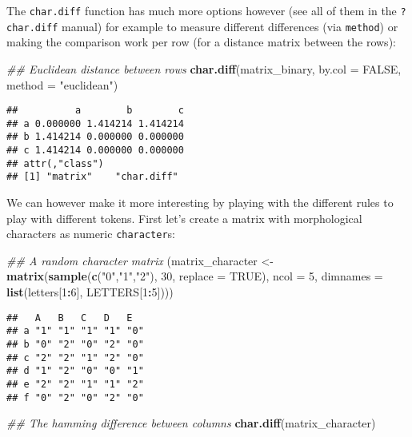 \documentclass[
]{book}
\newenvironment{Shaded}{\begin{snugshade}}{\end{snugshade}}
\newcommand{\CommentTok}[1]{\textcolor[rgb]{0.56,0.35,0.01}{\textit{#1}}}
\newcommand{\DataTypeTok}[1]{\textcolor[rgb]{0.13,0.29,0.53}{#1}}
\newcommand{\DecValTok}[1]{\textcolor[rgb]{0.00,0.00,0.81}{#1}}
\newcommand{\KeywordTok}[1]{\textcolor[rgb]{0.13,0.29,0.53}{\textbf{#1}}}
\newcommand{\NormalTok}[1]{#1}
\newcommand{\OperatorTok}[1]{\textcolor[rgb]{0.81,0.36,0.00}{\textbf{#1}}}
\newcommand{\OtherTok}[1]{\textcolor[rgb]{0.56,0.35,0.01}{#1}}
\newcommand{\StringTok}[1]{\textcolor[rgb]{0.31,0.60,0.02}{#1}}
\begin{document}
The \texttt{char.diff} function has much more options however (see all of them in the \texttt{?char.diff} manual) for example to measure different differences (via \texttt{method}) or making the comparison work per row (for a distance matrix between the rows):

\begin{Shaded}
\begin{Highlighting}[]
\CommentTok{\#\# Euclidean distance between rows}
\KeywordTok{char.diff}\NormalTok{(matrix\_binary, }\DataTypeTok{by.col =} \OtherTok{FALSE}\NormalTok{, }\DataTypeTok{method =} \StringTok{"euclidean"}\NormalTok{)}
\end{Highlighting}
\end{Shaded}

\begin{verbatim}
##          a        b        c
## a 0.000000 1.414214 1.414214
## b 1.414214 0.000000 0.000000
## c 1.414214 0.000000 0.000000
## attr(,"class")
## [1] "matrix"    "char.diff"
\end{verbatim}

We can however make it more interesting by playing with the different rules to play with different tokens.
First let's create a matrix with morphological characters as numeric \texttt{character}s:

\begin{Shaded}
\begin{Highlighting}[]
\CommentTok{\#\# A random character matrix}
\NormalTok{(matrix\_character \textless{}{-}}\StringTok{ }\KeywordTok{matrix}\NormalTok{(}\KeywordTok{sample}\NormalTok{(}\KeywordTok{c}\NormalTok{(}\StringTok{"0"}\NormalTok{,}\StringTok{"1"}\NormalTok{,}\StringTok{"2"}\NormalTok{), }\DecValTok{30}\NormalTok{, }\DataTypeTok{replace =} \OtherTok{TRUE}\NormalTok{), }\DataTypeTok{ncol =} \DecValTok{5}\NormalTok{,}
                           \DataTypeTok{dimnames =} \KeywordTok{list}\NormalTok{(letters[}\DecValTok{1}\OperatorTok{:}\DecValTok{6}\NormalTok{], LETTERS[}\DecValTok{1}\OperatorTok{:}\DecValTok{5}\NormalTok{])))}
\end{Highlighting}
\end{Shaded}

\begin{verbatim}
##   A   B   C   D   E  
## a "1" "1" "1" "1" "0"
## b "0" "2" "0" "2" "0"
## c "2" "2" "1" "2" "0"
## d "1" "2" "0" "0" "1"
## e "2" "2" "1" "1" "2"
## f "0" "2" "0" "2" "0"
\end{verbatim}

\begin{Shaded}
\begin{Highlighting}[]
\CommentTok{\#\# The hamming difference between columns}
\KeywordTok{char.diff}\NormalTok{(matrix\_character)}
\end{Highlighting}
\end{Shaded}
\end{document}
